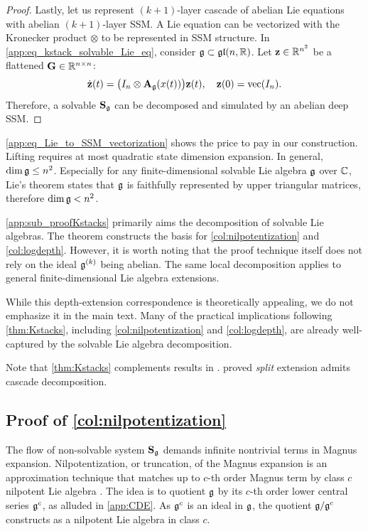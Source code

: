 \begin{proof}
    Lastly, let us represent $(k+1)$-layer cascade of abelian Lie equations with abelian $(k+1)$-layer SSM.
    A Lie equation can be vectorized with the Kronecker product $\otimes$
    to be represented in SSM structure.
    In \cref{app:eq_kstack_solvable_Lie_eq},
    consider $\mathfrak{g} \subset \mathfrak{gl}(n,\mathbb{R})$.
    Let $\mathbf{z} \in \mathbb{R}^{n^2}$ be a flattened $\mathbf{G} \in \mathbb{R}^{n \times n}$:
    \begin{equation}
    \label{app:eq_Lie_to_SSM_vectorization}
        \dot{\mathbf{z}}(t)
        =
        \bigl(
        I_n \otimes \mathbf{A}_{\mathfrak{g}}(x(t))
        \bigr)
        \mathbf{z}(t),
        \quad
        \mathbf{z}(0) = \text{vec}(I_n).
    \end{equation}
    Therefore, a solvable $\mathbf{S}_{\mathfrak{g}}$ can be decomposed and simulated by an abelian deep SSM.
\end{proof}
\cref{app:eq_Lie_to_SSM_vectorization} shows the price to pay in our construction.
    Lifting requires at most quadratic state dimension expansion.
    In general, $\dim \mathfrak{g} \le n^2$.
    Especially for any finite-dimensional solvable Lie algebra $\mathfrak{g}$ over $\mathbb{C}$,
    Lie's theorem states that $\mathfrak{g}$ is faithfully represented by upper triangular matrices,
    therefore $\dim \mathfrak{g} < n^2$.

\begin{remark}
\label{rem:non_abelian_extension_generalization}
    \cref{app:sub_proofKstacks} primarily aims the decomposition of solvable Lie algebras.
    The theorem constructs the basis for \cref{col:nilpotentization} and \cref{col:logdepth}.
    However, it is worth noting that the proof technique itself does not rely on the ideal $\mathfrak{g}^{(k)}$ being abelian.
    The same local decomposition applies to general finite-dimensional Lie algebra extensions.
    
    While this depth-extension correspondence is theoretically appealing, we do not emphasize it in the main text.
    Many of the practical implications following \cref{thm:Kstacks}, including \cref{col:nilpotentization} and \cref{col:logdepth}, are already well-captured by the solvable Lie algebra decomposition.
    
    Note that \cref{thm:Kstacks} complements results in \citet{krener1977decomposition}.
    \citet{krener1977decomposition} proved \emph{split} extension admits cascade decomposition.
\end{remark}
\subsection{Proof of \cref{col:nilpotentization}}
\label{app:sub_proof_nilpotentization}
The flow of non-solvable system $\mathbf{S}_{\mathfrak{g}}$ demands infinite nontrivial terms in Magnus expansion.
Nilpotentization, or truncation, of the Magnus expansion is
an approximation technique that matches up to $c$-th order Magnus term
by class $c$ nilpotent Lie algebra \cite{iserles2008magnus,blanes2009magnus}.
The idea is to quotient $\mathfrak{g}$ by its $c$-th order lower central series $\mathfrak{g}^c$, as alluded in \cref{app:CDE}.
As $\mathfrak{g}^c$ is an ideal in $\mathfrak{g}$, the quotient $\mathfrak{g}/\mathfrak{g}^c$ constructs as a nilpotent Lie algebra in class $c$.

